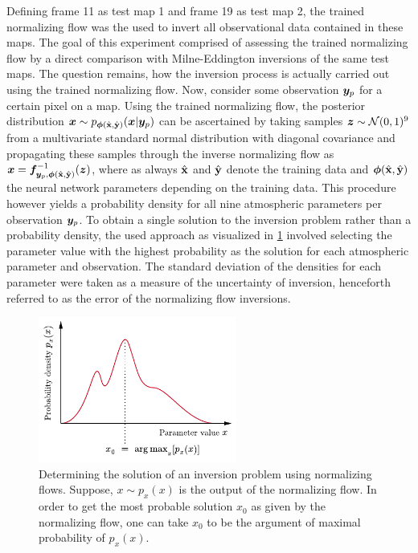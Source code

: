 \documentclass[a4paper,12pt]{report}
\begin{document}
Defining frame 11 as test map 1 and frame 19 as test map 2, the trained normalizing flow was the used to invert all observational data contained in these maps. The goal of this experiment comprised of assessing the trained normalizing flow by a direct comparison with Milne-Eddington inversions of the same test maps. The question remains, how the inversion process is actually carried out using the trained normalizing flow. Now, consider some observation $\bm{y}_{p}$ for a certain pixel on a map. Using the trained normalizing flow, the posterior distribution $\bm{x} \sim p_{\bm{\phi}(\hat{\boldsymbol{\mathbf{x}}},\hat{\boldsymbol{\mathbf{y}}})}(\bm{x}|\bm{y}_p)$ can be ascertained by taking samples $\bm{z} \sim \mathcal{N}(0,1)^9$ from a multivariate standard normal distribution with diagonal covariance and propagating these samples through the inverse normalizing flow as $\bm{x} = \bm{f}_{\bm{y}_p,\bm{\phi}(\hat{\boldsymbol{\mathbf{x}}},\hat{\boldsymbol{\mathbf{y}}})}^{-1}(\bm{z})$, where as always $\hat{\boldsymbol{\mathbf{x}}}$ and $\hat{\boldsymbol{\mathbf{y}}}$ denote the training data and $\bm{\phi}(\hat{\boldsymbol{\mathbf{x}}},\hat{\boldsymbol{\mathbf{y}}})$ the neural network parameters depending on the training data. This procedure however yields a probability density for all nine atmospheric parameters per observation $\bm{y}_p$. To obtain a single solution to the inversion problem rather than a probability density, the used approach as visualized in \cref{fig:argmax} involved selecting the parameter value with the highest probability as the solution for each atmospheric parameter and observation. The standard deviation of the densities for each parameter were taken as a measure of the uncertainty of inversion, henceforth referred to as the error of the normalizing flow inversions.
\begin{figure}[h!]
\centering
\includegraphics[width=6.5cm]{figures/argmax.pdf}
\caption{Determining the solution of an inversion problem using normalizing flows. Suppose, $x \sim p_x(x)$ is the output of the normalizing flow. In order to get the most probable solution $x_0$ as given by the normalizing flow, one can take $x_0$ to be the argument of maximal probability of $p_x(x)$.}
\label{fig:argmax}
\end{figure}
\end{document}
